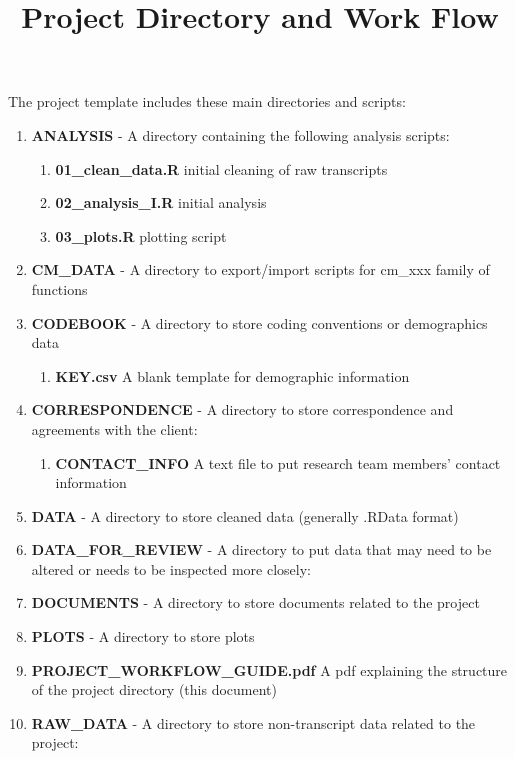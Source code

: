 \documentclass{article}\usepackage{graphicx, color}
\begin{document}
\title{Project Directory and Work Flow}
\author{}
\date{}
\maketitle

The project template includes these main directories and scripts:

\begin{enumerate}
  \item \textbf{ANALYSIS} - A directory containing the following analysis scripts:
  \begin{enumerate}
    \item \textbf{01\_clean\_data.R} initial cleaning of raw transcripts
    \item \textbf{02\_analysis\_I.R} initial analysis
    \item \textbf{03\_plots.R} plotting script
  \end{enumerate}
  \item \textbf{CM\_DATA} - A directory to export/import scripts for cm\_xxx family of functions
  \item \textbf{CODEBOOK} - A directory to store coding conventions or demographics data
  \begin{enumerate}
    \item \textbf{KEY.csv} A blank template for demographic information
  \end{enumerate}  
  \item \textbf{CORRESPONDENCE} - A directory to store correspondence and agreements 
     with the client:
  \begin{enumerate}
     \item \textbf{CONTACT\_INFO} A text file to put research team members' 
       contact information
  \end{enumerate}  
  \item \textbf{DATA} - A directory to store cleaned data (generally .RData 
     format)
  \item \textbf{DATA\_FOR\_REVIEW} - A directory to put data that may need to be altered or needs to be inspected more closely:
  \item \textbf{DOCUMENTS} - A directory to store documents related to the project
  \item \textbf{PLOTS} - A directory to store plots
  \item \textbf{PROJECT\_WORKFLOW\_GUIDE.pdf} A pdf explaining the structure of the project directory (this document) 
  \item \textbf{RAW\_DATA} - A directory to store non-transcript data related to the project:

\end{enumerate}
\end{document}
